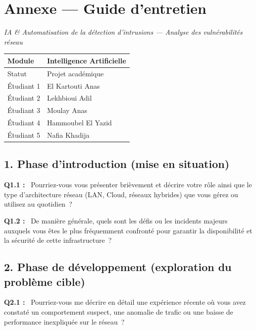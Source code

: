 \documentclass[12pt,a4paper]{article}
\newcommand{\og}{\guillemotleft\,}
\newcommand{\fg}{\,\guillemotright}
\begin{document}
\section*{Annexe --- Guide d'entretien}

\begin{center}
  \textit{IA \& Automatisation de la d\'{e}tection d'intrusions --- Analyse des vuln\'{e}rabilit\'{e}s r\'{e}seau}
\end{center}

\begin{tabular}{@{}B{4cm} L{10.5cm}@{}}
  \hline
  Module         & Intelligence Artificielle \\
  \hline
  Statut         & Projet acad\'{e}mique \\
  \hline
  \'{E}tudiant 1 & El Kartouti Anas \\
  \hline
  \'{E}tudiant 2 & Lekhbioui Adil \\
  \hline
  \'{E}tudiant 3 & Moulay Anas \\
  \hline
  \'{E}tudiant 4 & Hammoubel El Yazid \\
  \hline
  \'{E}tudiant 5 & Nafia Khadija \\
  \hline
\end{tabular}

\bigskip
\subsection*{1. Phase d'introduction (mise en situation)}

\textbf{Q1.1 :} \og{} Pourriez-vous vous pr\'{e}senter bri\`{e}vement et d\'{e}crire votre r\^{o}le ainsi que le
type d'architecture r\'{e}seau (LAN, Cloud, r\'{e}seaux hybrides) que vous g\'{e}rez ou utilisez au
quotidien~? \fg{}

\bigskip

\textbf{Q1.2 :} \og{} De mani\`{e}re g\'{e}n\'{e}rale, quels sont les d\'{e}fis ou les incidents majeurs auxquels
vous \^{e}tes le plus fr\'{e}quemment confront\'{e} pour garantir la disponibilit\'{e} et la s\'{e}curit\'{e} de cette
infrastructure~? \fg{}

\subsection*{2. Phase de d\'{e}veloppement (exploration du probl\`{e}me cible)}

\textbf{Q2.1 :} \og{} Pourriez-vous me d\'{e}crire en d\'{e}tail une exp\'{e}rience r\'{e}cente o\`{u} vous avez
constat\'{e} un comportement suspect, une anomalie de trafic ou une baisse de performance
inexpliquée sur le r\'{e}seau~? \fg{}
\end{document}
